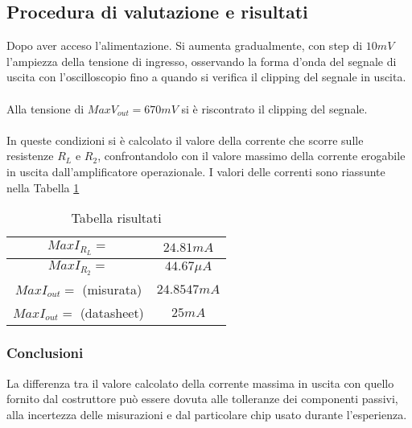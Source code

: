 \subsection{Procedura di valutazione e risultati}
Dopo aver acceso l'alimentazione. Si aumenta gradualmente, con step di $10mV$ l’ampiezza della tensione di ingresso, osservando la forma d’onda del segnale di uscita con l’oscilloscopio fino a quando si verifica il clipping del segnale in uscita.\\\\
Alla tensione di $Max V_{out} = 670mV$ si è riscontrato il clipping del segnale.\\\\
In queste condizioni si è calcolato il valore della corrente che scorre sulle resistenze $R_L$ e $R_2$, confrontandolo con il valore massimo della corrente erogabile in uscita dall'amplificatore operazionale. I valori delle correnti sono riassunte nella Tabella \ref{tab:Table2}
\begin{table}[H]
    \centering
    \begin{tabular}{|c|c|}
    \hline
       $Max I_{R_L}=$  & $24.81mA$ \\\hline
       $Max I_{R_2}=$  & $44.67\mu A$ \\\hline
       $Max I_{out}=$ (misurata) & $24.8547mA$ \\\hline
       $Max I_{out}=$ (datasheet) & $25mA$ \\\hline
    \end{tabular}
    \caption{Tabella risultati}
    \label{tab:Table2}
\end{table}
\subsubsection{Conclusioni}
La differenza tra il valore calcolato della corrente massima in uscita con quello fornito dal costruttore può essere dovuta alle tolleranze dei componenti passivi, alla incertezza delle misurazioni e dal particolare chip usato durante l’esperienza.